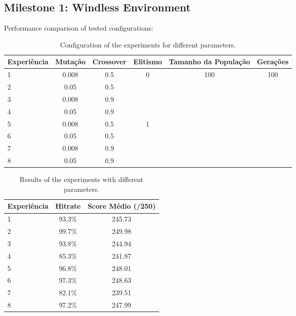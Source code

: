 \documentclass{article}
\begin{document}
\subsection{Milestone 1: Windless Environment}
Performance comparison of tested configurations:

\begin{table}[h]
\centering
\begin{tabular}{|l|c|c|c|c|c|}
\hline
\textbf{Experiência} & \textbf{Mutação} & \textbf{Crossover} & \textbf{Elitismo} & \textbf{Tamanho da População} & \textbf{Gerações} \\ 
\hline
1 & 0.008 & 0.5 & \multirow{4}{*}{0} & \multirow{8}{*}{100} & \multirow{8}{*}{100} \\ 
\cline{1-3}
2 & 0.05 & 0.5 & & & \\ 
\cline{1-3}
3 & 0.008 & 0.9 & & & \\ 
\cline{1-3}
4 & 0.05 & 0.9 & & & \\ 
\cline{1-4}
5 & 0.008 & 0.5 & \multirow{4}{*}{1} & & \\ 
\cline{1-3}
6 & 0.05 & 0.5 & & & \\ 
\cline{1-3}
7 & 0.008 & 0.9 & & & \\ 
\cline{1-3}
8 & 0.05 & 0.9 & & & \\ 
\hline
\end{tabular}

\caption{Configuration of the experiments for different parameters.}
\end{table}

\begin{table}[h]
\centering

\begin{tabular}{|l|c|c|}
\hline
\textbf{Experiência} & \textbf{Hitrate} & \textbf{Score Médio (/250)} \\ \hline
1 & 93.3\% & 245.73 \\ \hline
2 & 99.7\% & 249.98 \\ \hline
3 & 93.8\% & 244.94 \\ \hline
4 & 85.3\% & 241.87 \\ \hline
5 & 96.8\% & 248.01 \\ \hline
6 & 97.3\% & 248.63 \\ \hline
7 & 82.1\% & 239.51 \\ \hline
8 & 97.2\% & 247.99 \\ \hline
\end{tabular}
\caption{Results of the experiments with different parameters.}
\end{table}
\end{document}
